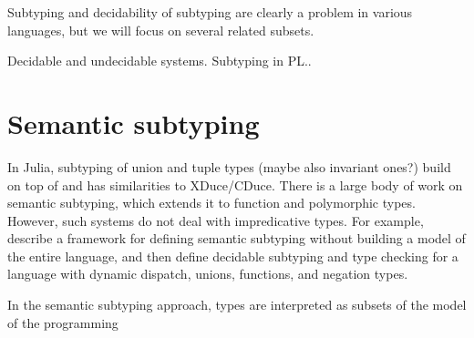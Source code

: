 




Subtyping and decidability of subtyping are clearly a problem in various languages,
but we will focus on several related subsets.

Decidable and undecidable systems. Subtyping in PL..

\section{Semantic subtyping}

In Julia, subtyping of union and tuple types (maybe also invariant ones?) build
on top of  and has similarities to XDuce/CDuce.
There is a large body of work on semantic subtyping, which extends it to
function and polymorphic types. However, such systems do not deal with
impredicative types.
For example, \citet{frih:sem-sub:2008} describe a framework for defining semantic
subtyping without building a model of the entire language, and then define
decidable subtyping and type checking for a language with dynamic dispatch,
unions, functions, and negation types.

In the semantic subtyping approach, types are interpreted as subsets of the
model of the programming

